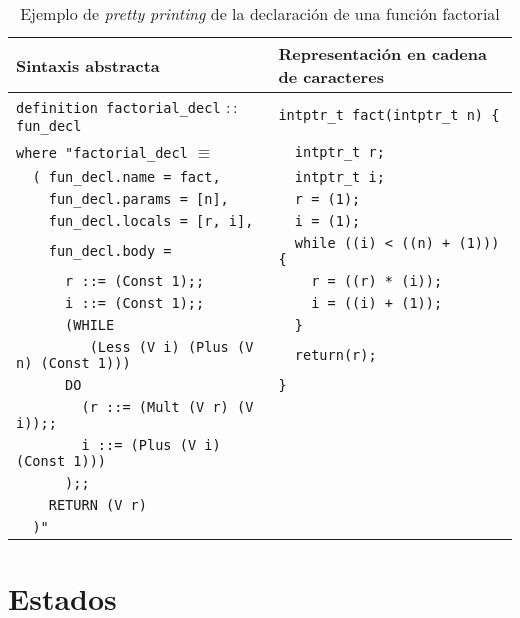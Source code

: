 \begin{table}[h!]
\centering
\begin{tabular}{|l|l|}
  \hline
  \textbf{Sintaxis abstracta} & \textbf{Representación en cadena de caracteres} \\ [0.5ex]
  \hline \hline
  \verb|definition factorial_decl| $::$ \verb|fun_decl|  & \verb|intptr_t fact(intptr_t n) {| \\
  \verb|where "factorial_decl| $\equiv$                  & \verb|  intptr_t r;| \\
  \verb|  ( fun_decl.name = fact,|                       & \verb|  intptr_t i;| \\
  \verb|    fun_decl.params = [n],|                      & \verb|  r = (1);| \\
  \verb|    fun_decl.locals = [r, i],|                   & \verb|  i = (1);| \\
  \verb|    fun_decl.body =|                             & \verb|  while ((i) < ((n) + (1))) {| \\
  \verb|      r ::= (Const 1);;|                         & \verb|    r = ((r) * (i));| \\
  \verb|      i ::= (Const 1);;|                         & \verb|    i = ((i) + (1));| \\
  \verb|      (WHILE|                                    & \verb|  }| \\
  \verb|         (Less (V i) (Plus (V n) (Const 1)))|    & \verb|  return(r);| \\
  \verb|      DO|                                        & \verb|}| \\
  \verb|        (r ::= (Mult (V r) (V i));;|             & \\
  \verb|        i ::= (Plus (V i) (Const 1)))|           & \\
  \verb|      );;|                                       & \\
  \verb|    RETURN (V r)|                                & \\
  \verb|  )"|                                            & \\
  \hline
\end{tabular}

\caption{Ejemplo de \textit{pretty printing} de la declaración de una función factorial}
\label{tab:pretty_function_fact}
\end{table}


\section{Estados}

